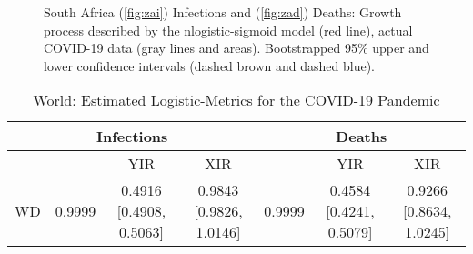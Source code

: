 \documentclass[journal]{IEEEtran}
\theoremstyle{plain}
\theoremstyle{definition}
\theoremstyle{remark}
\begin{document}
\begin{figure}[t]
	\centering
	\quad
	
	\caption{South Africa (\ref{fig:zai}) Infections and (\ref{fig:zad}) Deaths: Growth process described by the nlogistic-sigmoid model (red line), actual COVID-19 data (gray lines and areas). Bootstrapped 95\% upper and lower confidence intervals (dashed brown and dashed blue).}
	\label{fig:za}
\end{figure}
















\begin{table*}[t]
	\caption{World: Estimated Logistic-Metrics for the COVID-19 Pandemic}
	\centering
	\def\arraystretch{1.5}\begin{tabular}{|c|c|c|c|c|c|c|}
		\hline
		\multicolumn{4}{|c||}{Infections}&
		\multicolumn{3}{c|}{Deaths}\\
		\hline\hline
			 &  & YIR & XIR &  & YIR & XIR \\
		\hline\hline
WD&0.9999&	0.4916 [0.4908, 0.5063]& 0.9843 [0.9826, 1.0146]&	
0.9999&	0.4584 [0.4241, 0.5079]& 0.9266 [0.8634, 1.0245]\\	
\hline
\end{tabular}
\label{table_wd}
\end{table*}
\end{document}
